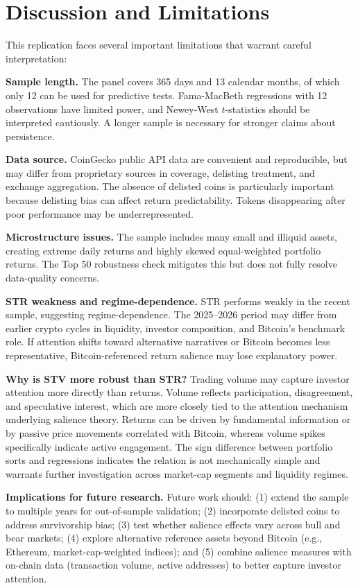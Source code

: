 \documentclass[11pt]{article}
\begin{document}
\section{Discussion and Limitations}

This replication faces several important limitations that warrant careful interpretation:

\textbf{Sample length.} The panel covers 365 days and 13 calendar months, of which only 12 can be used for predictive tests. Fama-MacBeth regressions with 12 observations have limited power, and Newey-West $t$-statistics should be interpreted cautiously. A longer sample is necessary for stronger claims about persistence.

\textbf{Data source.} CoinGecko public API data are convenient and reproducible, but may differ from proprietary sources in coverage, delisting treatment, and exchange aggregation. The absence of delisted coins is particularly important because delisting bias can affect return predictability. Tokens disappearing after poor performance may be underrepresented.

\textbf{Microstructure issues.} The sample includes many small and illiquid assets, creating extreme daily returns and highly skewed equal-weighted portfolio returns. The Top 50 robustness check mitigates this but does not fully resolve data-quality concerns.

\textbf{STR weakness and regime-dependence.} STR performs weakly in the recent sample, suggesting regime-dependence. The 2025--2026 period may differ from earlier crypto cycles in liquidity, investor composition, and Bitcoin's benchmark role. If attention shifts toward alternative narratives or Bitcoin becomes less representative, Bitcoin-referenced return salience may lose explanatory power.

\textbf{Why is STV more robust than STR?} Trading volume may capture investor attention more directly than returns. Volume reflects participation, disagreement, and speculative interest, which are more closely tied to the attention mechanism underlying salience theory. Returns can be driven by fundamental information or by passive price movements correlated with Bitcoin, whereas volume spikes specifically indicate active engagement. The sign difference between portfolio sorts and regressions indicates the relation is not mechanically simple and warrants further investigation across market-cap segments and liquidity regimes.

\textbf{Implications for future research.} Future work should: (1) extend the sample to multiple years for out-of-sample validation; (2) incorporate delisted coins to address survivorship bias; (3) test whether salience effects vary across bull and bear markets; (4) explore alternative reference assets beyond Bitcoin (e.g., Ethereum, market-cap-weighted indices); and (5) combine salience measures with on-chain data (transaction volume, active addresses) to better capture investor attention.
\end{document}
